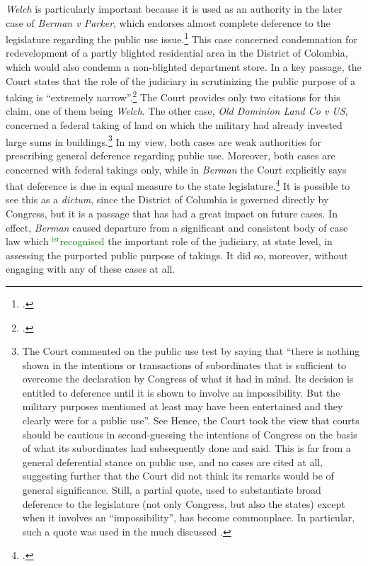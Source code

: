 \documentclass[12pt,a4paper]{book} %
\newcommand{\isr}[1]{\textcolor{green}{$^{\textrm{isr}}${#1}}}
\begin{document}
{\it Welch} is particularly important because it is used as an authority in the later case of {\it Berman v Parker}, which endorses almost complete deference to the legislature regarding the public use issue.\footcite[32]{berman54} This case concerned condemnation for redevelopment of a partly blighted residential area in the District of Colombia, which would also condemn a non-blighted department store. In a key passage, the Court states that the role of the judiciary in scrutinizing the public purpose of a taking is ``extremely narrow''.\footcite[32]{berman54} The Court provides only two citations for this claim, one of them being {\it Welch}. The other case, {\it Old Dominion Land Co v US}, concerned a federal taking of land on which the military had already invested large sums in buildings.\footnote{The Court commented on the public use test by saying that ``there is nothing shown in the intentions or transactions of subordinates that is sufficient to overcome the declaration by Congress of what it had in mind. Its decision is entitled to deference until it is shown to involve an impossibility. But the military purposes mentioned at least may have been entertained and they clearly were for a public use''. See \cite[66]{dominion25} Hence, the Court took the view that courts should be cautious in second-guessing the intentions of Congress on the basis of what its subordinates had subsequently done and said. This is far from a general deferential stance on public use, and no cases are cited at all, suggesting further that the Court did not think its remarks would be of general significance. Still, a partial quote, used to substantiate  broad deference to the legislature (not only Congress, but also the states) except when it involves an ``impossibility'', has become commonplace. In particular, such a quote was used in the much discussed \cite[240]{midkiff84}.}
In my view, both cases are weak authorities for prescribing general deference regarding public use. Moreover, both cases are concerned with federal takings only, while in {\it Berman} the Court explicitly says that deference is due in equal measure to the state legislature.\footcite[32]{berman54} It is possible to see this as a {\it dictum}, since the District of Columbia is governed directly by Congress, but it is a passage that has had a great impact on future cases. In effect, {\it Berman} caused departure from a significant and consistent body of case law which \isr{recognised} the important role of the judiciary, at state level, in assessing the purported public purpose of takings. It did so, moreover, without engaging with any of these cases at all.
\end{document}

